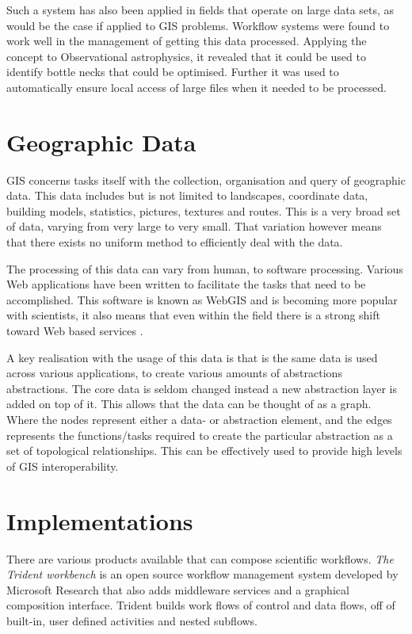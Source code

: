 \documentclass[11pt,twocolumn]{article}
\begin{document}
    Such a system has also been applied in fields that
    operate on large data sets, as would be the case if
    applied to GIS problems. Workflow systems were found
    to work well in the management of getting this data
    processed. Applying the concept to Observational
    astrophysics, it revealed that it could be used
    to identify bottle necks that could be optimised.
    Further it was used to automatically ensure local
    access of large files when it needed to be processed.
    \cite{Aragon:2009:WMH:1529282.1529491}

\section{Geographic Data}
    GIS concerns tasks itself with the collection, organisation
    and query of geographic data. This data includes but
    is not limited to landscapes, coordinate data, building models,
    statistics, pictures, textures and routes. This
    is a very broad set of data, varying from very large to very small.
    That variation however means that there exists no uniform method
    to efficiently deal with the data.

    The processing of this data can vary from human, to software
    processing. Various Web applications have been written
    to facilitate the tasks that need to be accomplished.
    This software is known as WebGIS and is becoming more
    popular with scientists, it also means that even within
    the field there is a strong shift toward Web based services
    \cite{DiMartino:2007:TAG:1341012.1341081}.

    A key realisation with the usage of this data is that
    is the same data is used across various applications,
    to create various amounts of abstractions abstractions.
    The core data is seldom changed instead a new abstraction
    layer is added on top of it. This allows that the data
    can be thought of as a graph. Where the nodes represent
    either a data- or abstraction element, and the edges
    represents the functions/tasks required to create the
    particular abstraction as a set of topological
    relationships. This can be effectively used to provide
    high levels of GIS
    interoperability\cite{ElAdnani:2001:MLF:512161.512177}.

\section{Implementations}
    There are various products available that can compose
    scientific workflows. \emph{The Trident workbench}
    \cite{Simmhan:2009:BTS:1673063.1673121} is an open
    source workflow management system developed by Microsoft
    Research that also adds middleware services and a graphical
    composition interface. Trident builds work flows of control
    and data flows, off of built-in, user defined activities and
    nested subflows.
\end{document}
